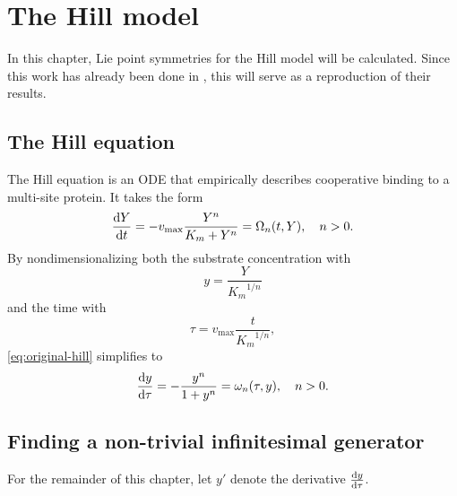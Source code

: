 \chapter{The Hill model}

In this chapter, Lie point symmetries for the Hill model will be calculated.
Since this work has already been done in \cite{ohlsson2020symmetry}, this will serve as a reproduction of their results.

\section{The Hill equation}

The Hill equation is an ODE that empirically describes cooperative binding to a multi-site protein.
It takes the form
\begin{equation} \label{eq:original-hill}
  \dv{Y}{t} = - v_\text{max} \frac{Y^n}{K_m + Y^n} = \Omega_n(t, Y), \quad
  n > 0.
\end{equation}
By nondimensionalizing both the substrate concentration with
\begin{equation}
  y = \frac{Y}{{K_m}^{1/n}}
\end{equation}
and the time with
\begin{equation}
  \tau = v_\text{max} \frac{t}{{K_m}^{1/n}},
\end{equation}
\cref{eq:original-hill} simplifies to
\begin{equation} \label{eq:hill}
  \dv{y}{\tau} = - \frac{y^n}{1 + y^n} = \omega_n(\tau, y), \quad
  n > 0.
\end{equation}

\section{Finding a non-trivial infinitesimal generator}

For the remainder of this chapter, let \(y'\) denote the derivative \(\dv{y}{\tau}\).

